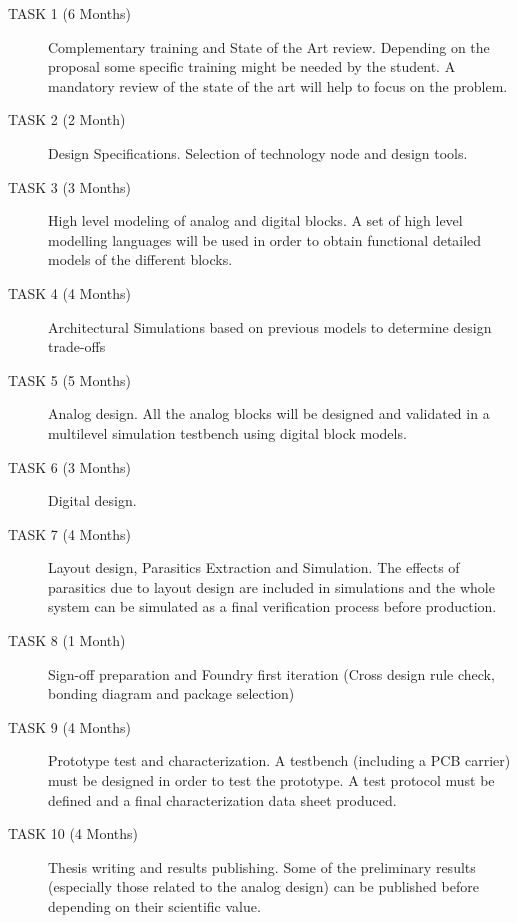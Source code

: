 \begin{description}
  \item[TASK 1 (6 Months)] Complementary training and State of the Art review. Depending on the proposal some specific training might be needed by the student. A mandatory review of the state of the art will help to focus on the problem.
  \item[TASK 2 (2 Month)] Design Specifications. Selection of technology node and design tools.
  \item[TASK 3 (3 Months)] High level modeling of analog and digital blocks. A set of high level modelling languages will be used in order to obtain functional detailed models of the different blocks.
  \item[TASK 4 (4 Months)] Architectural Simulations based on previous models to determine design trade-offs
  \item[TASK 5 (5 Months)] Analog design. All the analog blocks will be designed and validated in a multilevel simulation testbench using digital block models.
  \item[TASK 6 (3 Months)] Digital design.
  \item[TASK 7 (4 Months)] Layout design, Parasitics Extraction and Simulation. The effects of parasitics due to layout design are included in simulations and the whole system can be simulated as a final verification process before production.
  \item[TASK 8 (1 Month)] Sign-off preparation and Foundry first iteration (Cross design rule check, bonding diagram and package selection)
  \item[TASK 9 (4 Months)] Prototype test and characterization. A testbench (including a PCB carrier) must be designed in order to test the prototype. A test protocol must be defined and a final characterization data sheet produced.
  \item[TASK 10 (4 Months)] Thesis writing and results publishing. Some of the preliminary results (especially those related to the analog design) can be published before depending on their scientific value.
\end{description}

